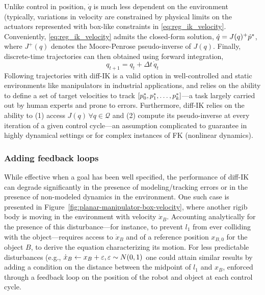 Unlike control in position, \( \dot q \) is much less dependent on the environment (typically, variations in velocity are constrained by physical limits on the actuators represented with box-like constraints in \ref{eq:reg_ik_velocity}.
Conveniently, \ref{eq:reg_ik_velocity} admits the closed-form solution, \( \dot q = J(q)^+ \dot {p}^* \), where \( J^+(q) \) denotes the Moore-Penrose pseudo-inverse of \( J(q) \).
Finally, discrete-time trajectories can then obtained using forward integration,
\[
q_{t+1} = q_t + \Delta t\,\dot q_t
\]
Following trajectories with diff-IK is a valid option in well-controlled and static environments like manipulators in industrial applications, and relies on the ability to define a set of target velocities to track \( [p^*_0, p^*_1, \dots, p^*_k ] \)---a task largely carried out by human experts and prone to errors.
Furthermore, diff-IK relies on the ability to (1) access \( J(q) \, \forall q \in \mathcal Q \) and (2) compute its pseudo-inverse at every iteration of a given control cycle---an assumption complicated to guarantee in highly dynamical settings or for complex instances of FK (nonlinear dynamics).

\subsubsection{Adding feedback loops}
While effective when a goal has been well specified, the performance of diff-IK can degrade significantly in the presence of modeling/tracking errors or in the presence of non-modeled dynamics in the environment.
One such case is presented in Figure~\ref{fig:planar-manipulator-box-velocity}, where another rigib body is moving in the environment with velocity \( \dot x_B \). 
Accounting analytically for the presence of this disturbance---for instance, to prevent \( l_1 \) from ever colliding with the object---requires access to \( \dot x_B \) and of a reference position \( x_{B,0} \) for the object \( B \), to derive the equation characterizing its motion.
For less predictable disturbances (e.g., \( \dot x_B \leftarrow x_B + {\varepsilon}, {\varepsilon} \sim N(0,1) \) one could attain similar results by adding a condition on the distance between the midpoint of \( l_1 \) and \( x_B \), enforced through a feedback loop on the position of the robot and object at each control cycle.

